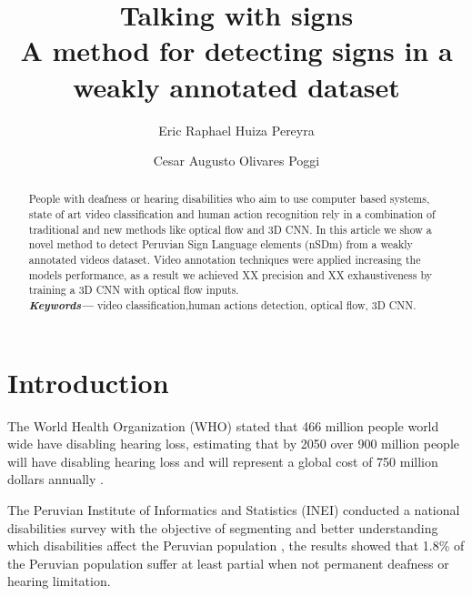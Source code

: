 \documentclass[twocolumn,conference]{article}
\providecommand{\keywords}[1]
{
  \small	
  \textbf{\textit{Keywords---}} #1
}
\begin{document}
\author[1]{Eric Raphael Huiza Pereyra}

\author[2]{Cesar Augusto Olivares Poggi}

\title{%
	\vspace{-2.0cm}
	\textbf{Talking with signs} \\	
	\Large \textbf{A method for detecting signs in a weakly annotated dataset}
}

\maketitle
    
\begin{abstract}
People with deafness or hearing disabilities who aim to use computer based systems, state of art video classification and human action recognition rely in a combination of traditional and new methods like optical flow and 3D CNN. In this article we show a novel method to detect Peruvian Sign Language elements (nSDm) from a weakly annotated videos dataset. Video annotation techniques were applied increasing the models performance, as a result we achieved XX precision and XX exhaustiveness by training a 3D CNN with optical flow inputs.   \\
\keywords{video classification,human actions detection, optical flow, 3D CNN.}
\end{abstract}

\section{Introduction}\label{intro}

The World Health Organization (WHO) stated that 466 million people world wide have disabling hearing loss, estimating that by 2050 over 900 million people will have disabling hearing loss and will represent a global cost of 750 million dollars annually \cite{deafness_and_hearing_loss_2019}. 

The Peruvian Institute of Informatics and Statistics (INEI) conducted a national disabilities survey with the objective of segmenting and better understanding which disabilities affect the Peruvian population \cite{disabilities_survey_2012}, the results showed that 1.8\% of the Peruvian population suffer at least partial when not permanent deafness or hearing limitation. 
\end{document}
